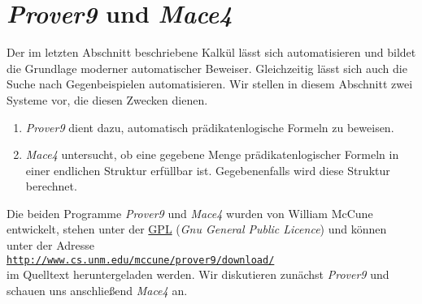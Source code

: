 \section{\textsl{Prover9} und \textsl{Mace4}}
Der im letzten Abschnitt beschriebene Kalkül lässt sich automatisieren und bildet die Grundlage moderner
automatischer Beweiser.  Gleichzeitig lässt sich auch die Suche nach Gegenbeispielen automatisieren.
Wir stellen in diesem Abschnitt zwei Systeme vor, die diesen Zwecken dienen.
\begin{enumerate}
\item \textsl{Prover9} dient dazu, automatisch prädikatenlogische Formeln zu beweisen.
\item \textsl{Mace4} untersucht, ob eine gegebene Menge prädikatenlogischer Formeln in einer endlichen
  Struktur erfüllbar ist.  Gegebenenfalls wird diese Struktur berechnet.
\end{enumerate}
Die beiden Programme \textsl{Prover9} und \textsl{Mace4} wurden von William McCune \cite{mccune:2010} 
entwickelt, stehen unter der \href{http://www.gnu.org/licenses/gpl.html}{GPL} (\emph{Gnu General
  Public Licence}) und können unter der Adresse 
\\[0.2cm]
\hspace*{1.3cm}
\href{http://www.cs.unm.edu/~mccune/prover9/download/}{\texttt{http://www.cs.unm.edu/mccune/prover9/download/}}
\\[0.2cm]
im Quelltext heruntergeladen werden.  Wir diskutieren zunächst \textsl{Prover9} und schauen uns anschließend
\textsl{Mace4} an.

